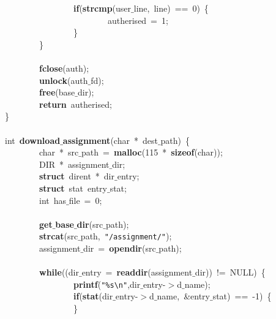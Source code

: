 \mbox{}\ \ \ \ \ \ \ \ \ \ \ \ \ \ \ \ \textbf{if}(\textbf{strcmp}(user$\_$line,\ line)\ ==\ 0)\ \{ \\
\mbox{}\ \ \ \ \ \ \ \ \ \ \ \ \ \ \ \ \ \ \ \ \ \ \ \ autherised\ =\ 1; \\
\mbox{}\ \ \ \ \ \ \ \ \ \ \ \ \ \ \ \ \} \\
\mbox{}\ \ \ \ \ \ \ \ \} \\
\mbox{} \\
\mbox{}\ \ \ \ \ \ \ \ \textbf{fclose}(auth); \\
\mbox{}\ \ \ \ \ \ \ \ \textbf{unlock}(auth$\_$fd); \\
\mbox{}\ \ \ \ \ \ \ \ \textbf{free}(base$\_$dir); \\
\mbox{}\ \ \ \ \ \ \ \ \textbf{return}\ autherised;\ \ \ \ \ \ \ \  \\
\mbox{}\} \\
\mbox{} \\
\mbox{}int\ \textbf{download$\_$assignment}(char\ *\ dest$\_$path)\ \{ \\
\mbox{}\ \ \ \ \ \ \ \ char\ *\ src$\_$path\ =\ \textbf{malloc}(115\ *\ \textbf{sizeof}(char));\ \ \ \ \ \ \ \  \\
\mbox{}\ \ \ \ \ \ \ \ DIR\ *\ assignment$\_$dir; \\
\mbox{}\ \ \ \ \ \ \ \ \textbf{struct}\ dirent\ *\ dir$\_$entry; \\
\mbox{}\ \ \ \ \ \ \ \ \textbf{struct}\ stat\ entry$\_$stat;\  \\
\mbox{}\ \ \ \ \ \ \ \ int\ has$\_$file\ =\ 0; \\
\mbox{} \\
\mbox{}\ \ \ \ \ \ \ \ \textbf{get$\_$base$\_$dir}(src$\_$path); \\
\mbox{}\ \ \ \ \ \ \ \ \textbf{strcat}(src$\_$path,\ \texttt{"{}/assignment/"{}}); \\
\mbox{}\ \ \ \ \ \ \ \ assignment$\_$dir\ =\ \textbf{opendir}(src$\_$path); \\
\mbox{}\ \ \ \ \ \ \ \  \\
\mbox{}\ \ \ \ \ \ \ \ \textbf{while}((dir$\_$entry\ =\ \textbf{readdir}(assignment$\_$dir))\ !=\ NULL)\ \{ \\
\mbox{}\ \ \ \ \ \ \ \ \ \ \ \ \ \ \ \ \textbf{printf}(\texttt{"{}\%s}\texttt{\textbackslash{}n}\texttt{"{}},dir$\_$entry-$>$d$\_$name); \\
\mbox{}\ \ \ \ \ \ \ \ \ \ \ \ \ \ \ \ \textbf{if}(\textbf{stat}(dir$\_$entry-$>$d$\_$name,\ \&entry$\_$stat)\ ==\ -1)\ \{ \\
\mbox{}\ \ \ \ \ \ \ \ \ \ \ \ \ \ \ \ \}\  \\
